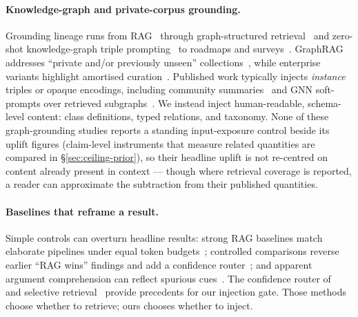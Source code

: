 \documentclass[10pt,twocolumn]{article}
\begin{document}
\paragraph{Knowledge-graph and private-corpus grounding.}
Grounding lineage runs from RAG~\cite{lewis2020rag} through graph-structured retrieval~\cite{edge2024graphrag,guo2024lightrag} and zero-shot knowledge-graph triple prompting~\cite{baek2023kaping} to roadmaps and surveys~\cite{pan2024unifying,peng2024graphragsurvey}. GraphRAG addresses ``private and/or previously unseen'' collections~\cite{edge2024graphrag}, while enterprise variants highlight amortised curation~\cite{min2025practicalgraphrag}. Published work typically injects \emph{instance} triples or opaque encodings, including community summaries~\cite{edge2024graphrag} and GNN soft-prompts over retrieved subgraphs~\cite{he2024gretriever}. We instead inject human-readable, schema-level content: class definitions, typed relations, and taxonomy. None of these graph-grounding studies reports a standing input-exposure control beside its uplift figures (claim-level instruments that measure related quantities are compared in \S\ref{sec:ceiling-prior}), so their headline uplift is not re-centred on content already present in context --- though where retrieval coverage is reported, a reader can approximate the subtraction from their published quantities.

\paragraph{Baselines that reframe a result.}
Simple controls can overturn headline results: strong RAG baselines match elaborate pipelines under equal token budgets~\cite{laitenberger2025stronger}; controlled comparisons reverse earlier ``RAG wins'' findings and add a confidence router~\cite{li2024ragorlongcontext}; and apparent argument comprehension can reflect spurious cues~\cite{niven2019probing}. The confidence router of~\textcite{li2024ragorlongcontext} and selective retrieval~\cite{asai2024selfrag,jeong2024adaptiverag,mallen2023trust} provide precedents for our injection gate. Those methods choose whether to retrieve; ours chooses whether to inject.
\end{document}
